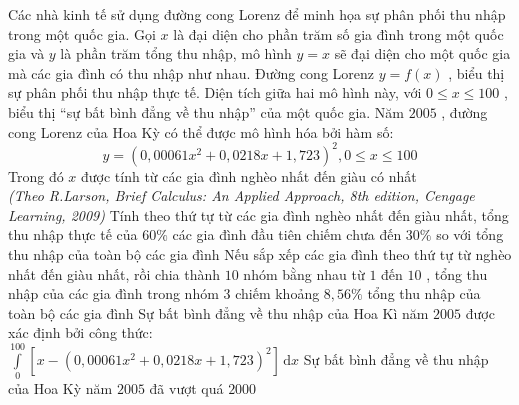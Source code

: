 \begin{ex}%
Các nhà kinh tế sử dụng đường cong Lorenz để minh họa sự phân phối thu nhập trong một quốc gia. Gọi $x$ là đại diện cho phần trăm số gia đình trong một quốc gia và $y$ là phần trăm tổng thu nhập, mô hình $y=x$ sẽ đại diện cho một quốc gia mà các gia đình có thu nhập như nhau. Đường cong Lorenz $y=f(x)$ , biểu thị sự phân phối thu nhập thực tế. Diện tích giữa hai mô hình này, với $0\le x\le 100$ , biểu thị “sự bất bình đẳng về thu nhập” của một quốc gia. Năm $2005$ , đường cong Lorenz của Hoa Kỳ có thể được mô hình hóa bởi hàm số:
$$y=\left(0,00061x^2+0,0218x+1,723\right)^2,0\le x\le 100$$
Trong đó $x$ được tính từ các gia đình nghèo nhất đến giàu có nhất\\
\textit{(Theo R.Larson, Brief Calculus: An Applied Approach, 8th edition, Cengage Learning, 2009)}
\choiceTF
{\True Tính theo thứ tự từ các gia đình nghèo nhất đến giàu nhất, tổng thu nhập thực tế của $60\%$ các gia đình đầu tiên chiếm chưa đến $30\%$ so với tổng thu nhập của toàn bộ các gia đình}
{Nếu sắp xếp các gia đình theo thứ tự từ nghèo nhất đến giàu nhất, rồi chia thành $10$ nhóm bằng nhau từ $1$ đến $10$ , tổng thu nhập của các gia đình trong nhóm $3$ chiếm khoảng $8,56\%$ tổng thu nhập của toàn bộ các gia đình}
{Sự bất bình đẳng về thu nhập của Hoa Kì năm $2005$ được xác định bởi công thức:\\
$\displaystyle\int\limits_0^{100}{\left[x-\left(0,00061x^2+0,0218x+1,723\right)^2\right]\mathrm{\,d}x}$}
{\True Sự bất bình đẳng về thu nhập của Hoa Kỳ năm $2005$ đã vượt quá $2000$}
\loigiai{

}
\end{ex}
